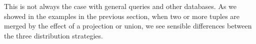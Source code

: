 This is not always the case with general queries and other databases. As we showed in the examples in the previous section, when two or more tuples are merged by the effect of a projection or union, we see sensible differences between the three distribution strategies. %


